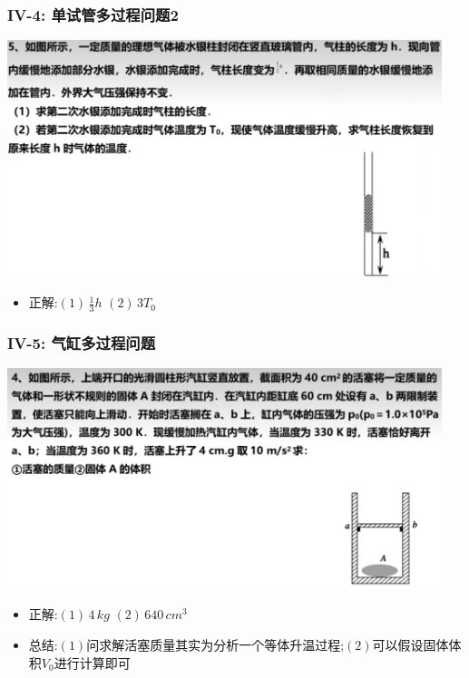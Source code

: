 \documentclass{article}
\begin{document}
\vspace{2em}

\subsubsection{IV-4: 单试管多过程问题2}
\includegraphics[width = 0.95\textwidth,keepaspectratio]{./pictures/2.3-15.png}

\begin{itemize}
    \item 正解:\quad $(1) \, \frac{1}{3}h$  $(2) \, 3T_{0}$
\end{itemize}

\vspace{2em}

\subsubsection{IV-5: 气缸多过程问题}
\includegraphics[width = 0.95\textwidth,keepaspectratio]{./pictures/2.3-16.png}

\begin{itemize}
    \item 正解:\quad $(1) \, 4 \, kg$  $(2) \, 640 \, cm^{3}$
    \item 总结:\quad $(1)$问求解活塞质量其实为分析一个等体升温过程;$(2)$可以假设固体体积$V_{0}$进行计算即可
\end{itemize}
\end{document}
